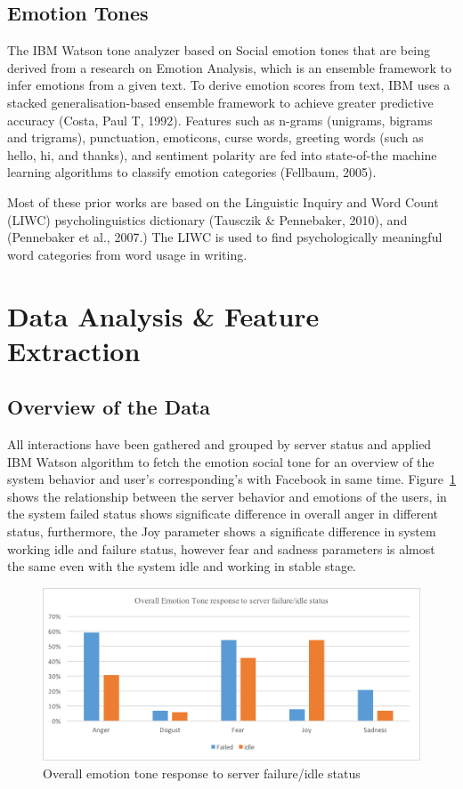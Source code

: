 \documentclass[graybox]{svmult}
\begin{document}
\subsection{Emotion Tones}

The IBM Watson tone analyzer based on Social emotion tones that are being
derived from a research on Emotion Analysis, which is an ensemble
framework to infer emotions from a given text. To derive emotion
scores from text, IBM uses a stacked generalisation-based ensemble
framework to achieve greater predictive accuracy (Costa, Paul T,
1992). Features such as n-grams (unigrams, bigrams and trigrams),
punctuation, emoticons, curse words, greeting words (such as hello,
hi, and thanks), and sentiment polarity are fed into state-of-the
machine learning algorithms to classify emotion categories (Fellbaum,
2005).

Most of these prior works are based on the Linguistic Inquiry and Word
Count (LIWC) psycholinguistics dictionary (Tausczik \& Pennebaker,
2010), and (Pennebaker et al., 2007.) The LIWC is used to find
psychologically meaningful word categories from word usage in writing.


\section{Data Analysis \& Feature Extraction}

\subsection{Overview of the Data}

All interactions have been gathered and grouped by server status and
applied IBM Watson algorithm to fetch the emotion social tone for an
overview of the system behavior and user’s corresponding’s with
Facebook in same time. Figure~\ref{fig:emotiontone} shows the
relationship between the server behavior and emotions of the users, in
the system failed status shows significate difference in overall anger
in different status, furthermore, the Joy parameter shows a
significate difference in system working idle and failure status,
however fear and sadness parameters is almost the same even with the
system idle and working in stable stage.

\begin{figure}[!ht]
\centering
\includegraphics[width=\columnwidth]{images/emotiontone}
\caption{Overall emotion tone response to server failure/idle status}
\label{fig:emotiontone} 
\end{figure}
\end{document}
